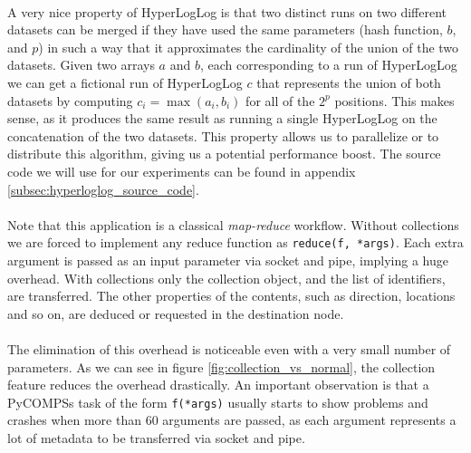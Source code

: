 \\
A very nice property of HyperLogLog is that two distinct runs on two different datasets can be merged if they have used the same parameters (hash function, $b$, and $p$) in such a way that it approximates the cardinality of the union of the two datasets. Given two arrays $a$ and $b$, each corresponding to a run of HyperLogLog we can get a fictional run of HyperLogLog $c$ that represents the union of both datasets by computing $c_{i} =\max(a_{i}, b_{i})$ for all of the $2^{p}$ positions. This makes sense, as it produces the same result as running a single HyperLogLog on the concatenation of the two datasets. This property allows us to parallelize or to distribute this algorithm, giving us a potential performance boost. The source code we will use for our experiments can be found in appendix \ref{subsec:hyperloglog_source_code}.\\
\\
Note that this application is a classical \textit{map-reduce} workflow. Without collections we are forced to implement any reduce function as \verb|reduce(f, *args)|. Each extra argument is passed as an input parameter via socket and pipe, implying a huge overhead. With collections only the collection object, and the list of identifiers, are transferred. The other properties of the contents, such as direction, locations and so on, are deduced or requested in the destination node.\\
\\
The elimination of this overhead is noticeable even with a very small number of parameters. As we can see in figure \ref{fig:collection_vs_normal}, the collection feature reduces the overhead drastically. An important observation is that a PyCOMPSs task of the form \verb|f(*args)| usually starts to show problems and crashes when more than $60$ arguments are passed, as each argument represents a lot of metadata to be transferred via socket and pipe.
